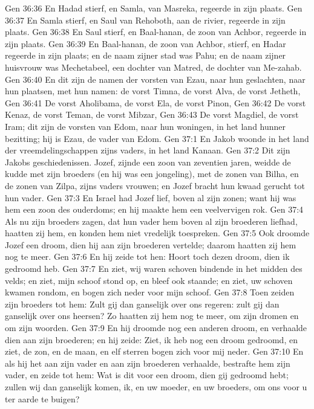 Gen 36:36  En Hadad stierf, en Samla, van Masreka, regeerde in zijn plaats.
Gen 36:37  En Samla stierf, en Saul van Rehoboth, aan de rivier, regeerde in zijn plaats.
Gen 36:38  En Saul stierf, en Baal-hanan, de zoon van Achbor, regeerde in zijn plaats.
Gen 36:39  En Baal-hanan, de zoon van Achbor, stierf, en Hadar regeerde in zijn plaats; en de naam zijner stad was Pahu; en de naam zijner huisvrouw was Mechetabeel, een dochter van Matred, de dochter van Me-zahab.
Gen 36:40  En dit zijn de namen der vorsten van Ezau, naar hun geslachten, naar hun plaatsen, met hun namen: de vorst Timna, de vorst Alva, de vorst Jetheth,
Gen 36:41  De vorst Aholibama, de vorst Ela, de vorst Pinon,
Gen 36:42  De vorst Kenaz, de vorst Teman, de vorst Mibzar,
Gen 36:43  De vorst Magdiel, de vorst Iram; dit zijn de vorsten van Edom, naar hun woningen, in het land hunner bezitting; hij is Ezau, de vader van Edom.
Gen 37:1  En Jakob woonde in het land der vreemdelingschappen zijns vaders, in het land Kanaan.
Gen 37:2  Dit zijn Jakobs geschiedenissen. Jozef, zijnde een zoon van zeventien jaren, weidde de kudde met zijn broeders (en hij was een jongeling), met de zonen van Bilha, en de zonen van Zilpa, zijns vaders vrouwen; en Jozef bracht hun kwaad gerucht tot hun vader.
Gen 37:3  En Israel had Jozef lief, boven al zijn zonen; want hij was hem een zoon des ouderdoms; en hij maakte hem een veelvervigen rok.
Gen 37:4  Als nu zijn broeders zagen, dat hun vader hem boven al zijn broederen liefhad, haatten zij hem, en konden hem niet vredelijk toespreken.
Gen 37:5  Ook droomde Jozef een droom, dien hij aan zijn broederen vertelde; daarom haatten zij hem nog te meer.
Gen 37:6  En hij zeide tot hen: Hoort toch dezen droom, dien ik gedroomd heb.
Gen 37:7  En ziet, wij waren schoven bindende in het midden des velds; en ziet, mijn schoof stond op, en bleef ook staande; en ziet, uw schoven kwamen rondom, en bogen zich neder voor mijn schoof.
Gen 37:8  Toen zeiden zijn broeders tot hem: Zult gij dan ganselijk over ons regeren: zult gij dan ganselijk over ons heersen? Zo haatten zij hem nog te meer, om zijn dromen en om zijn woorden.
Gen 37:9  En hij droomde nog een anderen droom, en verhaalde dien aan zijn broederen; en hij zeide: Ziet, ik heb nog een droom gedroomd, en ziet, de zon, en de maan, en elf sterren bogen zich voor mij neder.
Gen 37:10  En als hij het aan zijn vader en aan zijn broederen verhaalde, bestrafte hem zijn vader, en zeide tot hem: Wat is dit voor een droom, dien gij gedroomd hebt; zullen wij dan ganselijk komen, ik, en uw moeder, en uw broeders, om ons voor u ter aarde te buigen?
